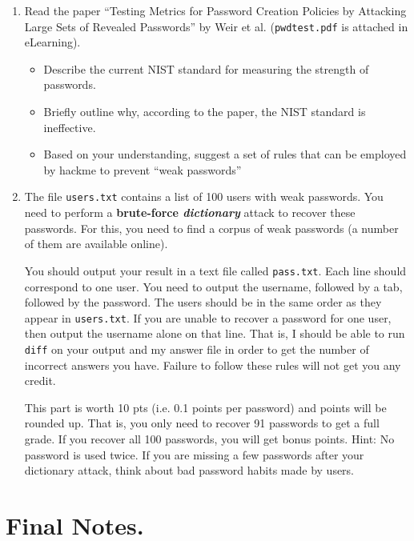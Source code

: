 \documentclass[]{article}
\begin{document}
\begin{enumerate}
	\item Read the paper ``Testing Metrics for Password Creation Policies by Attacking Large Sets of Revealed Passwords'' by Weir et al. (\texttt{pwdtest.pdf} is attached in eLearning).
		\begin{itemize}
			\item Describe the current NIST standard for measuring the strength of passwords.

			\item Briefly outline why, according to the paper, the NIST standard is ineffective.

			\item Based on your understanding, suggest a set of rules that can be employed by hackme to prevent ``weak passwords''
		\end{itemize}
		
	\item The file \verb"users.txt" contains a list of 100 users with weak passwords. You need to perform a \textbf{brute-force \emph{dictionary}} attack to recover these passwords. For this, you need to find a corpus of weak passwords (a number of them are available online). 
	
	You should output your result in a text file called \verb"pass.txt". Each line should correspond to one user. You need to output the username, followed by a tab, followed by the password. The users should be in the same order as they appear in \verb"users.txt". If you are unable to recover a password for one user, then output the username alone on that line. That is, I should be able to run \verb"diff" on your output and my answer file in order to get the number of incorrect answers you have. Failure to follow these rules will not get you any credit.
	
	This part is worth 10 pts (i.e. 0.1 points per password) and points will be rounded up. That is, you only need to recover 91 passwords to get a full grade. If you recover all 100 passwords, you will get bonus points. Hint: No password is used twice. If you are missing a few passwords after your dictionary attack, think about bad password habits made by users. 

\end{enumerate}

\section{Final Notes.}
\end{document}
